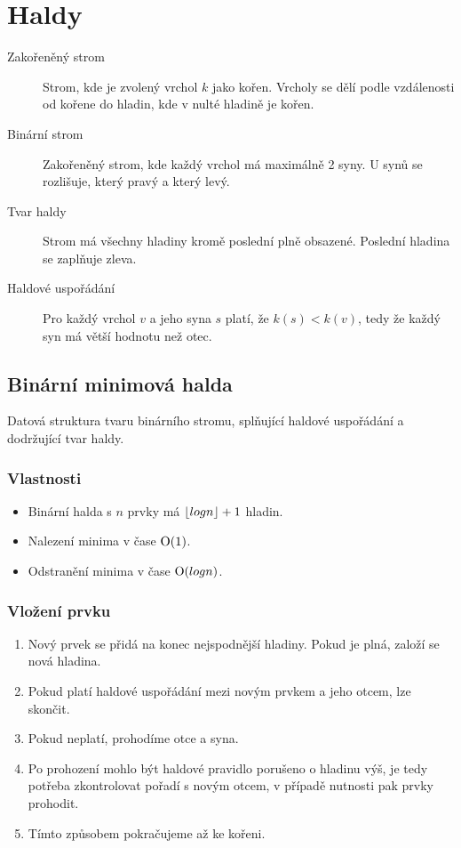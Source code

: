 \section{Haldy}

  \begin{description}
    \item[Zakořeněný strom] Strom, kde je zvolený vrchol $k$ jako kořen. Vrcholy se dělí podle vzdálenosti od kořene do hladin, kde v nulté hladině je kořen.
    \item[Binární strom] Zakořeněný strom, kde každý vrchol má maximálně 2 syny. U synů se rozlišuje, který pravý a který levý.
    \item[Tvar haldy] Strom má všechny hladiny kromě poslední plně obsazené. Poslední hladina se zaplňuje zleva.
    \item[Haldové uspořádání] Pro každý vrchol $v$ a jeho syna $s$ platí, že $k(s) < k(v)$, tedy že každý syn má větší hodnotu než otec.
  \end{description}

  \subsection{Binární minimová halda}
  Datová struktura tvaru binárního stromu, splňující haldové uspořádání a dodržující tvar haldy.

    \subsubsection{Vlastnosti}
      \begin{itemize}
        \item Binární halda s $n$ prvky má $\lfloor log n\rfloor + 1$ hladin.
        \item Nalezení minima v čase $\textrm O(1)$.
        \item Odstranění minima v čase $\textrm O(log n)$.
      \end{itemize}

    \subsubsection{Vložení prvku}
      \begin{enumerate}
        \item Nový prvek se přidá na konec nejspodnější hladiny. Pokud je plná, založí se nová hladina.
        \item Pokud platí haldové uspořádání mezi novým prvkem a jeho otcem, lze skončit.
        \item Pokud neplatí, prohodíme otce a syna.
        \item Po prohození mohlo být haldové pravidlo porušeno o hladinu výš, je tedy potřeba zkontrolovat pořadí s novým otcem, v případě nutnosti pak prvky prohodit.
        \item Tímto způsobem pokračujeme až ke kořeni.
      \end{enumerate}

